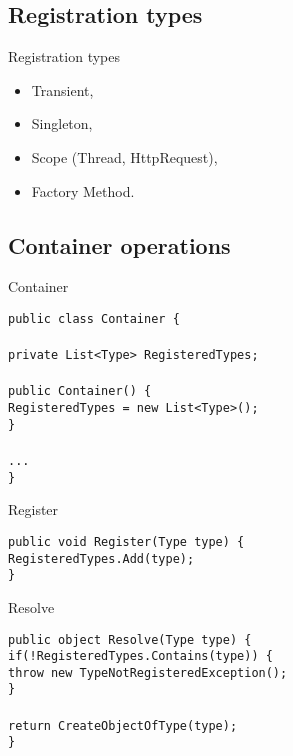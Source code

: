\documentclass{beamer}
\newcommand{\code}[1]{{\texttt{#1}}}
\begin{document}
\subsection*{Registration types}

\begin{frame}{Registration types}
     \begin{Large}
	\begin{itemize}
		\item Transient,
		\item Singleton,
		\item Scope (Thread, HttpRequest),
		\item Factory Method.
	\end{itemize}
     \end{Large}
\end{frame}

\subsection*{Container operations}

\begin{frame}{Container}
     \begin{large}
	\code{public class Container \{}\\
	\code{}\\ \quad
		\code{private List<Type> RegisteredTypes;}\\ \quad
		\code{}\\ \quad
		\code{public Container() \{}\\ \qquad
		\code{RegisteredTypes = new List<Type>();}\\ \quad
		\code{\}}\\ \quad
		\code{}\\ \quad
		\code{...}\\
	\code{\}}
     \end{large}
\end{frame}

\begin{frame}{Register}
     \begin{large}
	\code{public void Register(Type type) \{}\\ \quad
		\code{RegisteredTypes.Add(type);}\\
	\code{\}}
     \end{large}
\end{frame}

\begin{frame}{Resolve}
     \begin{large}
	\code{public object Resolve(Type type) \{}\\ \quad
		\code{if(!RegisteredTypes.Contains(type)) \{}\\ \qquad
		\code{throw new TypeNotRegisteredException();}\\ \quad
		\code{\}}\\ \quad
		\code{}\\ \quad
		\code{return CreateObjectOfType(type);}\\
	\code{\}}
     \end{large}
\end{frame}
\end{document}
